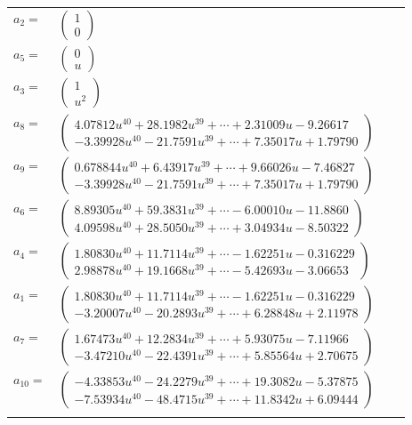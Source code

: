 \documentclass[1p]{elsarticle_modified}
\theoremstyle{definition}
\begin{document}
\begin{tabular}{m{7pt} m{180pt} m{7pt} m{180pt} }
\flushright $a_{2}=$&$\begin{pmatrix}1\\0\end{pmatrix}$ \\
\flushright $a_{5}=$&$\begin{pmatrix}0\\u\end{pmatrix}$ \\
\flushright $a_{3}=$&$\begin{pmatrix}1\\u^2\end{pmatrix}$ \\
\flushright $a_{8}=$&$\begin{pmatrix}4.07812 u^{40}+28.1982 u^{39}+\cdots+2.31009 u-9.26617\\-3.39928 u^{40}-21.7591 u^{39}+\cdots+7.35017 u+1.79790\end{pmatrix}$ \\
\flushright $a_{9}=$&$\begin{pmatrix}0.678844 u^{40}+6.43917 u^{39}+\cdots+9.66026 u-7.46827\\-3.39928 u^{40}-21.7591 u^{39}+\cdots+7.35017 u+1.79790\end{pmatrix}$ \\
\flushright $a_{6}=$&$\begin{pmatrix}8.89305 u^{40}+59.3831 u^{39}+\cdots-6.00010 u-11.8860\\4.09598 u^{40}+28.5050 u^{39}+\cdots+3.04934 u-8.50322\end{pmatrix}$ \\
\flushright $a_{4}=$&$\begin{pmatrix}1.80830 u^{40}+11.7114 u^{39}+\cdots-1.62251 u-0.316229\\2.98878 u^{40}+19.1668 u^{39}+\cdots-5.42693 u-3.06653\end{pmatrix}$ \\
\flushright $a_{1}=$&$\begin{pmatrix}1.80830 u^{40}+11.7114 u^{39}+\cdots-1.62251 u-0.316229\\-3.20007 u^{40}-20.2893 u^{39}+\cdots+6.28848 u+2.11978\end{pmatrix}$ \\
\flushright $a_{7}=$&$\begin{pmatrix}1.67473 u^{40}+12.2834 u^{39}+\cdots+5.93075 u-7.11966\\-3.47210 u^{40}-22.4391 u^{39}+\cdots+5.85564 u+2.70675\end{pmatrix}$ \\
\flushright $a_{10}=$&$\begin{pmatrix}-4.33853 u^{40}-24.2279 u^{39}+\cdots+19.3082 u-5.37875\\-7.53934 u^{40}-48.4715 u^{39}+\cdots+11.8342 u+6.09444\end{pmatrix}$\\&\end{tabular}
\end{document}
